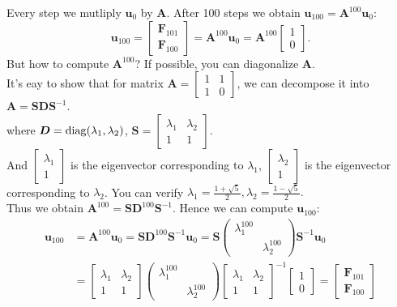 Every step we mutliply $\bm u_0$ by $\bm A$. After 100 steps we obtain $\bm u_{100}=\bm A^{100}\bm u_0$:
\[
\bm u_{100}=\begin{bmatrix}
\bm F_{101}\\\bm F_{100}
\end{bmatrix}=\bm A^{100}\bm u_0=\bm A^{100}\begin{bmatrix}
1\\0
\end{bmatrix}.
\]
But how to compute $\bm A^{100}$? If possible, you can diagonalize $\bm A$.\\ It's eay to show that for matrix $\bm A=\begin{bmatrix}
1&1\\1&0
\end{bmatrix}$, we can decompose it into
$
\bm A=\bm S\bm D\bm S^{-1}.
$\\
where $\bm D=\operatorname{diag}(\lambda_1,\lambda_2)$, $\bm S=\begin{bmatrix}
\lambda_1&\lambda_2\\1&1
\end{bmatrix}.$\\
And $\begin{bmatrix}
\lambda_1\\1
\end{bmatrix}$ is the eigenvector corresponding to $\lambda_1$, $\begin{bmatrix}
\lambda_2\\1
\end{bmatrix}$ is the eigenvector corresponding to $\lambda_2$. You can verify $\lambda_1=\frac{1+\sqrt{5}}{2},\lambda_2=\frac{1-\sqrt{5}}{2}.$\\
Thus we obtain $\bm A^{100}=\bm S\bm D^{100}\bm S^{-1}$. Hence we can compute $\bm u_{100}$:
\begin{align*}
\bm u_{100}&=\bm A^{100}\bm u_0=\bm S\bm D^{100}\bm S^{-1}\bm u_0=\bm S\begin{pmatrix}
\lambda_1^{100}&\\&\lambda_2^{100}
\end{pmatrix}\bm S^{-1}\bm u_0
\\&=\begin{bmatrix}
\lambda_1&\lambda_2\\1&1
\end{bmatrix}\begin{pmatrix}
\lambda_1^{100}&\\&\lambda_2^{100}
\end{pmatrix}\begin{bmatrix}
\lambda_1&\lambda_2\\1&1
\end{bmatrix}^{-1}\begin{bmatrix}
1\\0
\end{bmatrix}=\begin{bmatrix}
\bm F_{101}\\\bm F_{100}
\end{bmatrix}
\end{align*}
